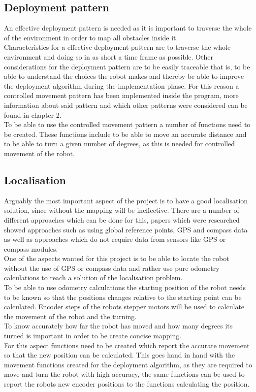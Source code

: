 \subsection{Deployment pattern}
An effective deployment pattern is needed as it is important to traverse the whole of the environment in order to map all obstacles inside it.\\
Characteristics for a effective deployment pattern are to traverse the whole environment and doing so in as short a time frame as possible. Other considerations for the deployment pattern are to be easily traceable that is, to be able to understand the choices the robot makes and thereby be able to improve the deployment algorithm during the implementation phase. For this reason a controlled movement pattern has been implemented inside the program, more information about said pattern and which other patterns were considered can be found in chapter 2. \\
To be able to use the controlled movement pattern a number of functions need to be created. 
These functions include to be able to move an accurate distance and to be able to turn a given number of degrees, as this is needed for controlled movement of the robot. 

\subsection{Localisation}
Arguably the most important aspect of the project is to have a good localisation solution, since without the mapping will be ineffective. There are a number of different approaches which can be done for this, papers which were researched showed approaches such as using global reference points, GPS and compass data as well as approaches which do not require data from sensors like GPS or compass modules.\\
One of the aspects wanted for this project is to be able to locate the robot without the use of GPS or compass data and rather use pure odometry calculations to reach a solution of the localisation problem.\\[3ex]

To be able to use odometry calculations the starting position of the robot needs to be known so that the positions changes relative to the starting point can be calculated. Encoder steps of the robots stepper motors will be used to calculate the movement of the robot and the turning. \\
To know accurately how far the robot has moved and how many degrees its turned is important in order to be create concise mapping. \\
For this aspect functions need to be created which report the accurate movement so that the new position can be calculated. This goes hand in hand with the movement functions created for the deployment algorithm, as they are required to move and turn the robot with high accuracy, the same functions can be used to report the robots new encoder positions to the functions calculating the position. 

